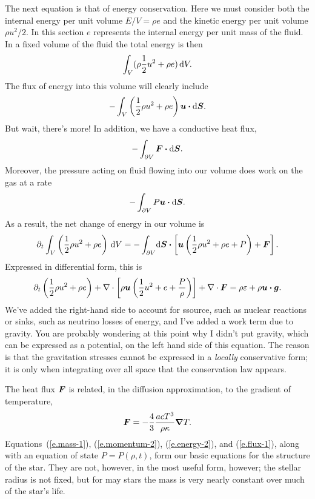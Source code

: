 The next equation is that of energy conservation. Here we must consider both the internal energy per unit volume $E/V = \rho e$ and the kinetic energy per unit volume $\rho u^{2}/2$.  In this section $e$ represents the internal energy per unit mass of the fluid. In a fixed volume of the fluid the total energy is then 
\[ \int_{V}(\rho \frac{1}{2}u^{2} + \rho e)\,\mathrm{d} V. \]
The flux of energy into this volume will clearly include
\[ -\int_{V}\left(\frac{1}{2}\rho u^{2} + \rho e\right) \boldsymbol{u}\boldsymbol{\cdot}\mathrm{d}\boldsymbol{S}. \]
But wait, there's more!  In addition, we have a conductive heat flux, 
\[-\int_{\partial V}\boldsymbol{F}\boldsymbol{\cdot}\mathrm{d}\boldsymbol{S}.\] 
Moreover, the pressure acting on fluid flowing into our volume does work on the gas at a rate 
\[-\int_{\partial V}P\boldsymbol{u}\boldsymbol{\cdot}\mathrm{d}\boldsymbol{S}.\] 
As a result, the net change of energy in our volume is 
\begin{equation}\label{e.energy-1}
\partial_{t}\int_{V}\left(\frac{1}{2}\rho u^{2} + \rho e\right)\,\mathrm{d} V 
	= -\int_{\partial V} \!\mathrm{d}\boldsymbol{S}\boldsymbol{\cdot}\left[\boldsymbol{u}\left(\frac{1}{2}\rho u^{2} + \rho e + P\right) + \boldsymbol{F}\right].
\end{equation}
Expressed in differential form, this is
\begin{equation}\label{e.energy-2}
 \partial_{t}\left(\frac{1}{2}\rho u^{2} + \rho e\right) 
 	+ \nabla \cdot\left[\rho\boldsymbol{u}\left(\frac{1}{2} u^{2} + e + \frac{P}{\rho}\right)\right]
	+ \nabla \cdot\boldsymbol{F} = \rho\varepsilon + \rho \boldsymbol{u}\boldsymbol{\cdot}\boldsymbol{g}.
\end{equation}
We've added the right-hand side to account for ssource, such as nuclear reactions or sinks, such as neutrino losses of energy, and I've added a work term due to gravity.
You are probably wondering at this point why I didn't put gravity, which can be expressed as a potential, on the left hand side of this equation.  The reason is that the gravitation stresses cannot be expressed in a  \emph{locally} conservative form; it is only when integrating over all space that the conservation law appears.

The heat flux $\boldsymbol{F}$ is related, in the diffusion approximation, to the gradient of temperature,
\begin{equation}\label{e.flux-1}
\boldsymbol{F} = -\frac{4}{3}\frac{acT^{3}}{\rho\kappa}\boldsymbol{\nabla} T.
\end{equation}
Equations~(\ref{e.mass-1}), (\ref{e.momentum-2}), (\ref{e.energy-2}), and (\ref{e.flux-1}), along with an equation of state $P = P(\rho,t)$, form our basic equations for the structure of the star.  They are not, however, in the most useful form, however; the stellar radius is not fixed, but for may stars the mass is very nearly constant over much of the star's life.  

